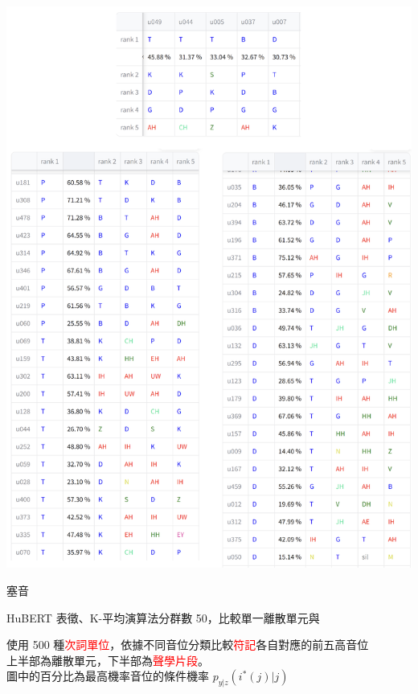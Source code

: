     {
        \begin{table}
            \centering
            \begin{subtable}{\textwidth}
                \centering
                \includegraphics[width=0.8\linewidth]{figures/ch4figs/plo_phn.png}
                \caption{塞音}
                \label{subtabfig:hub-u050-ap0500-ploobs}
            \end{subtable}

            \caption{HuBERT 表徵、K-平均演算法分群數 50，比較單一離散單元與}
            使用 500 種\textcolor{red}{次詞單位}，依據不同音位分類比較\textcolor{red}{符記}各自對應的前五高音位 \\
            上半部為離散單元，下半部為\textcolor{red}{聲學片段}。 \\
            圖中的百分比為最高機率音位的條件機率 $p_{y|z}(i^*(j)|j)$
            \label{tabfig:hub-u050-phnobserver}
        \end{table}

}
